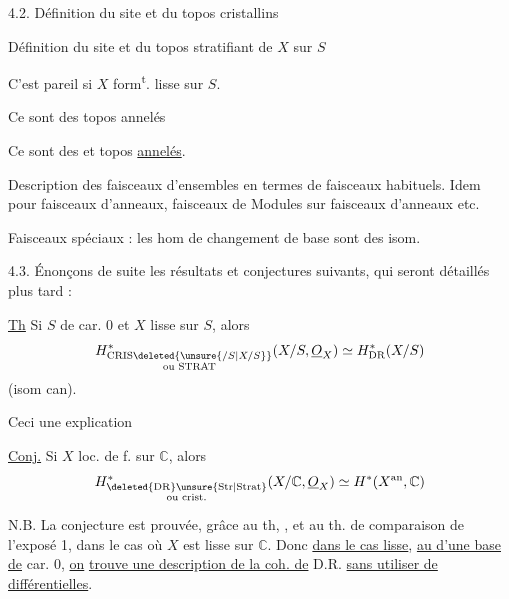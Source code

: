 4.2. Définition du site et du topos cristallins 

Définition du site et du topos stratifiant de $X$ sur $S$

C'est pareil si $X$ form\textsuperscript{t}. lisse sur $S$.

Ce sont des topos annelés

 

Ce sont des  et topos \uline{annelés}.

Description des  faisceaux d'ensembles en termes de faisceaux habituels. Idem pour faisceaux d'anneaux, faisceaux de Modules sur faisceaux d'anneaux etc.

Faisceaux spéciaux : les hom de changement de base sont des isom.


4.3. Énonçons de suite les résultats et conjectures suivants, qui seront  détaillés plus tard :

\uline{Th} Si $S$ de car. $0$ et $X$ lisse sur $S$, alors
\[
H^*_{\substack{\mathrm{CRIS}\deleted{\unsure{/S|X/S}}\\\text{ou }\mathrm{STRAT}}}(X/S,\underline O_X)\simeq H^*_{\mathrm{DR}}(X/S)
\]
(isom can). 

Ceci  une explication

\uline{Conj.} Si $X$ loc. de  f. sur $\mathbb C$, alors
\[
H^*_{\substack{\deleted{\mathrm{DR}}\unsure{\mathrm{Str}|\mathrm{Strat}}\\\text{ou }\mathrm{crist.}}}(X/\mathbb C,\underline O_X)\simeq H^*(X^{\mathrm{an}},\mathbb C)
\]

N.B. La conjecture est prouvée, grâce au th, , et au th. de comparaison de l'exposé 1, dans le cas où $X$ est lisse sur $\mathbb C$. Donc \uline{dans le cas lisse}, \uline{au  d'une base de} car. $0$, \uline{on} \uline{trouve une description de la coh. de} D.R. \uline{sans utiliser de différentielles}.

